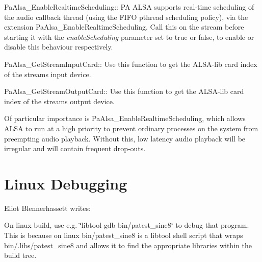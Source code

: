 Pa\+Alsa\+\_\+\+Enable\+Realtime\+Scheduling\+:\+: PA A\+L\+SA supports real-\/time scheduling of the audio callback thread (using the F\+I\+FO pthread scheduling policy), via the extension Pa\+Alsa\+\_\+\+Enable\+Realtime\+Scheduling. Call this on the stream before starting it with the {\itshape enable\+Scheduling} parameter set to true or false, to enable or disable this behaviour respectively.

Pa\+Alsa\+\_\+\+Get\+Stream\+Input\+Card\+:\+: Use this function to get the A\+L\+S\+A-\/lib card index of the stream\textquotesingle{}s input device.

Pa\+Alsa\+\_\+\+Get\+Stream\+Output\+Card\+:\+: Use this function to get the A\+L\+S\+A-\/lib card index of the stream\textquotesingle{}s output device.

Of particular importance is Pa\+Alsa\+\_\+\+Enable\+Realtime\+Scheduling, which allows A\+L\+SA to run at a high priority to prevent ordinary processes on the system from preempting audio playback. Without this, low latency audio playback will be irregular and will contain frequent drop-\/outs.\hypertarget{compile_linux_comp_linux5}{}\section{Linux Debugging}\label{compile_linux_comp_linux5}
Eliot Blennerhassett writes\+:

On linux build, use e.\+g. \char`\"{}libtool gdb bin/patest\+\_\+sine8\char`\"{} to debug that program. This is because on linux bin/patest\+\_\+sine8 is a libtool shell script that wraps bin/.libs/patest\+\_\+sine8 and allows it to find the appropriate libraries within the build tree. 